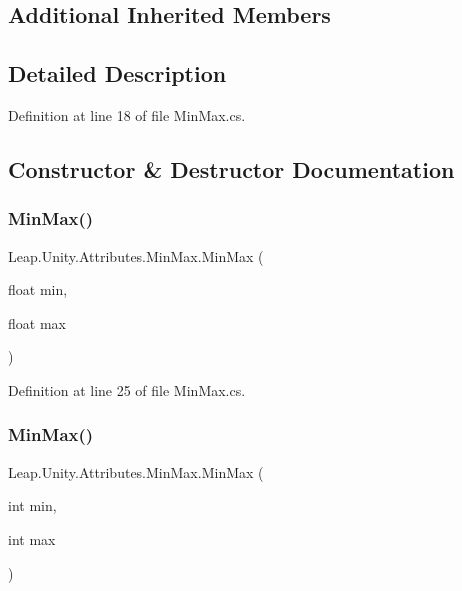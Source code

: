 \subsection*{Additional Inherited Members}


\subsection{Detailed Description}


Definition at line 18 of file Min\+Max.\+cs.



\subsection{Constructor \& Destructor Documentation}
\mbox{\label{class_leap_1_1_unity_1_1_attributes_1_1_min_max_a9ad8b6438b676075ee2eb0f39711f314}} 
\subsubsection{\texorpdfstring{MinMax()}{MinMax()}\hspace{0.1cm}{\footnotesize\ttfamily [1/2]}}
{\footnotesize\ttfamily Leap.\+Unity.\+Attributes.\+Min\+Max.\+Min\+Max (\begin{DoxyParamCaption}\item[{float}]{min,  }\item[{float}]{max }\end{DoxyParamCaption})}



Definition at line 25 of file Min\+Max.\+cs.

\mbox{\label{class_leap_1_1_unity_1_1_attributes_1_1_min_max_a539ca33e10800a71f45d235644ba3d6c}} 
\subsubsection{\texorpdfstring{MinMax()}{MinMax()}\hspace{0.1cm}{\footnotesize\ttfamily [2/2]}}
{\footnotesize\ttfamily Leap.\+Unity.\+Attributes.\+Min\+Max.\+Min\+Max (\begin{DoxyParamCaption}\item[{int}]{min,  }\item[{int}]{max }\end{DoxyParamCaption})}




